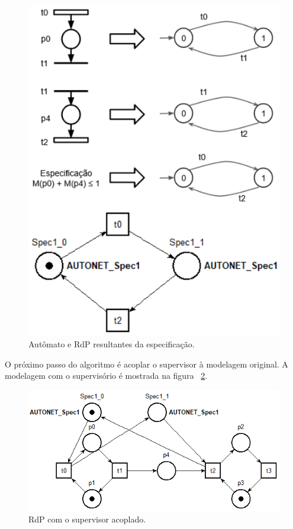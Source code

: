 \begin{figure}[!htb]
	\caption[Aut\^omato e RdP resultantes da especifica\c{c}\~ao.]{Aut\^omato e RdP resultantes da especifica\c{c}\~ao.}
	\label{fig:pqnafabespec}
	\includegraphics[width=16cm]{./figuras/PQNAFABESPEC.png}\centering
\end{figure}

O pr\'oximo passo do algoritmo \'e acoplar o supervisor \`a modelagem original. A modelagem com o supervis\'orio \'e mostrada na figura ~\ref{fig:pqnafabsup}.

\begin{figure}[!htb]
	\caption[RdP com o supervisor acoplado.]{RdP com o supervisor acoplado.}
	\label{fig:pqnafabsup}
	\includegraphics[width=16cm]{./figuras/PQNAFABSUP.png}\centering
\end{figure}

